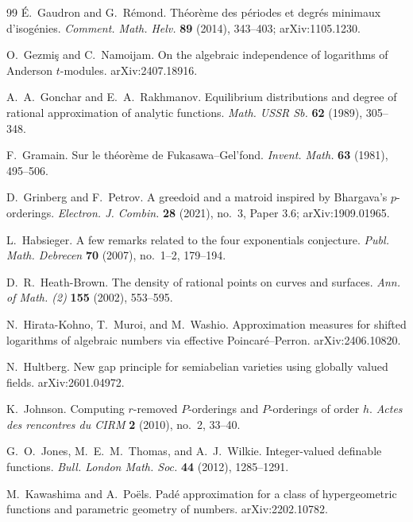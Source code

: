 \documentclass[10pt,letterpaper]{article}
\begin{document}
\begin{thebibliography}{99}
\'E.~Gaudron and G.~R\'emond.
\newblock Th\'eor\`eme des p\'eriodes et degr\'es minimaux d'isog\'enies.
\newblock \emph{Comment. Math. Helv.} \textbf{89} (2014), 343--403; arXiv:1105.1230.

O.~Gezmi\c{s} and C.~Namoijam.
\newblock On the algebraic independence of logarithms of Anderson $t$-modules.
\newblock arXiv:2407.18916.

A.~A.~Gonchar and E.~A.~Rakhmanov.
\newblock Equilibrium distributions and degree of rational approximation of analytic functions.
\newblock \emph{Math. USSR Sb.} \textbf{62} (1989), 305--348.

F.~Gramain.
\newblock Sur le th\'eor\`eme de Fukasawa--Gel'fond.
\newblock \emph{Invent. Math.} \textbf{63} (1981), 495--506.

D.~Grinberg and F.~Petrov.
\newblock A greedoid and a matroid inspired by Bhargava's $p$-orderings.
\newblock \emph{Electron. J. Combin.} \textbf{28} (2021), no.~3, Paper 3.6; arXiv:1909.01965.

L.~Habsieger.
\newblock A few remarks related to the four exponentials conjecture.
\newblock \emph{Publ. Math. Debrecen} \textbf{70} (2007), no.~1--2, 179--194.

D.~R.~Heath-Brown.
\newblock The density of rational points on curves and surfaces.
\newblock \emph{Ann. of Math. (2)} \textbf{155} (2002), 553--595.

N.~Hirata-Kohno, T.~Muroi, and M.~Washio.
\newblock Approximation measures for shifted logarithms of algebraic numbers via effective Poincar\'e--Perron.
\newblock arXiv:2406.10820.

N.~Hultberg.
\newblock New gap principle for semiabelian varieties using globally valued fields.
\newblock arXiv:2601.04972.

K.~Johnson.
\newblock Computing $r$-removed $P$-orderings and $P$-orderings of order $h$.
\newblock \emph{Actes des rencontres du CIRM} \textbf{2} (2010), no.~2, 33--40.

G.~O.~Jones, M.~E.~M.~Thomas, and A.~J.~Wilkie.
\newblock Integer-valued definable functions.
\newblock \emph{Bull. London Math. Soc.} \textbf{44} (2012), 1285--1291.

M.~Kawashima and A.~Po\"els.
\newblock Pad\'e approximation for a class of hypergeometric functions and parametric geometry of numbers.
\newblock arXiv:2202.10782.


\end{thebibliography}
\end{document}

